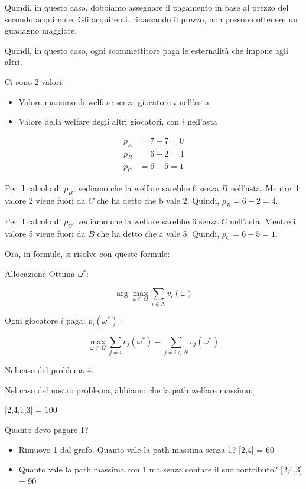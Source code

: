 Quindi, in questo caso, dobbiamo assegnare il pagamento in base al prezzo del secondo acquirente. Gli acquirenti, ribassando il prezzo, non possono ottenere un guadagno maggiore.

Quindi, in questo caso, ogni scommettitore paga le esternalità che impone agli altri.

Ci sono 2 valori:
\begin{itemize}
\item Valore massimo di welfare senza giocatore $i$ nell'asta
\item Valore della welfare degli altri giocatori, con $i$ nell'asta
\end{itemize}

\[
\begin{aligned}
p_A &= 7 - 7 = 0 \\
p_B &= 6 - 2 = 4 \\
p_C &= 6 - 5 = 1
\end{aligned}
\]

Per il calcolo di $p_B$, vediamo che la welfare sarebbe 6 senza $B$ nell'asta. Mentre il valore 2 viene fuori da $C$ che ha detto che b vale 2. Quindi, $p_B = 6 - 2 = 4$.

Per il calcolo di $p_C$, vediamo che la welfare sarebbe 6 senza $C$ nell'asta. Mentre il valore 5 viene fuori da $B$ che ha detto che a vale 5. Quindi, $p_C = 6 - 5 = 1$.

Ora, in formule, si risolve con queste formule:

Allocazione Ottima $\omega^*$:

\[
\arg \max_{\omega \in \Omega} \sum_{i \in N} v_i(\omega)
\]

Ogni giocatore $i$ paga: $p_i(\omega^*)$ = 

\[
\max_{\omega \in \Omega} \sum_{j \neq i} v_j(\omega^*) - \sum_{j \neq i \in N} v_j(\omega^*)
\]

Nel caso del problema 4.

Nel caso del nostro problema, abbiamo che la path welfare massimo:

[2,4,1,3] = 100

Quanto devo pagare 1?

\begin{itemize}
\item Rimuovo 1 dal grafo. Quanto vale la path massima senza 1? [2,4] = 60
\item Quanto vale la path massima con 1 ma senza contare il suo contributo? [2,4,3] = 90
\end{itemize}

